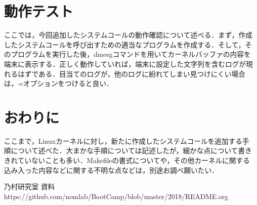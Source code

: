 \documentclass[12pt]{jsarticle}
\begin{document}
\section{動作テスト} 
ここでは，今回追加したシステムコールの動作確認について述べる．まず，作成したシステムコールを呼び出すための適当なプログラムを作成する．そして，そのプログラムを実行した後，dmesgコマンドを用いてカーネルバッファの内容を端末に表示する．正しく動作していれば，端末に設定した文字列を含むログが現れるはずである．目当てのログが，他のログに紛れてしまい見つけにくい場合は，-cオプションをつけると良い．
\section{おわりに}
\label{sec:conclusion}
ここまで，Linuxカーネルに対し，新たに作成したシステムコールを追加する手順について述べた．大まかな手順については記述したが，細かな点について書ききれていないことも多い．Makefileの書式についてや，その他カーネルに関する込み入った内容などに関する不明な点などは，別途お調べ願いたい．

\begin{thebibliography}{1}
   乃村研究室 資料　https:\slash{}\slash{}github.com\slash{}nomlab\slash{}BootCamp\slash{}blob\slash{}master\slash{}2018\slash{}README.org
\end{thebibliography}

%
%
\end{document}
